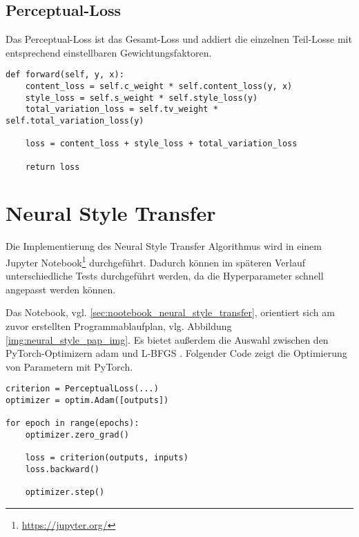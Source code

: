 \subsection{Perceptual-Loss}

Das Perceptual-Loss ist das Gesamt-Loss und addiert die einzelnen Teil-Losse mit entsprechend einstellbaren Gewichtungsfaktoren.

\begin{listing}[H]
\begin{verbatim}
def forward(self, y, x):
    content_loss = self.c_weight * self.content_loss(y, x)
    style_loss = self.s_weight * self.style_loss(y)
    total_variation_loss = self.tv_weight * self.total_variation_loss(y)

    loss = content_loss + style_loss + total_variation_loss

    return loss
\end{verbatim}
\end{listing}

\section{Neural Style Transfer}

Die Implementierung des Neural Style Transfer Algorithmus wird in einem Jupyter Notebook\footnote{\url{https://jupyter.org/}} durchgeführt. 
Dadurch können im späteren Verlauf unterschiedliche Tests durchgeführt werden, da die Hyperparameter schnell angepasst werden können.

Das Notebook, vgl. \ref{sec:nootebook_neural_style_transfer}, orientiert sich am zuvor erstellten Programmablaufplan, vlg. Abbildung \ref{img:neural_style_pap_img}. Es bietet außerdem die Auswahl zwischen den PyTorch-Optimizern \gls{adam} und L-BFGS \cite{Liu1989}. Folgender Code zeigt die Optimierung von Parametern mit PyTorch.

\begin{listing}[H]
\begin{verbatim}
criterion = PerceptualLoss(...)
optimizer = optim.Adam([outputs])

for epoch in range(epochs):
    optimizer.zero_grad()

    loss = criterion(outputs, inputs)
    loss.backward()

    optimizer.step()    
\end{verbatim}
\end{listing}

